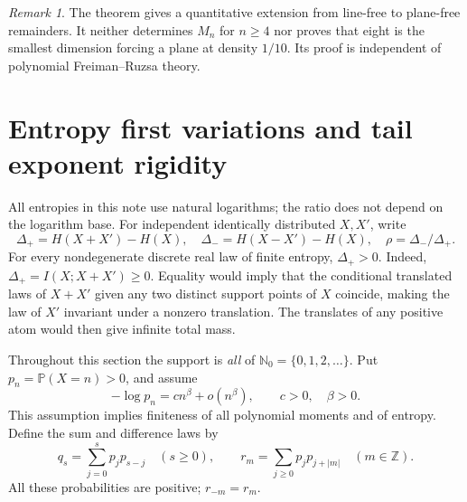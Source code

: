 \documentclass[11pt]{article}
\theoremstyle{remark}\newtheorem{remark}[theorem]{Remark}
\newcommand{\N}{\mathbb N_0}
\newcommand{\Prob}{\mathbb P}
\newcommand{\Dplus}{\Delta_+}
\newcommand{\Dminus}{\Delta_-}
\begin{document}
\begin{remark}
The theorem gives a quantitative extension from line-free to plane-free
remainders. It neither determines $M_n$ for $n\geq4$ nor proves that eight
is the smallest dimension forcing a plane at density $1/10$. Its proof is
independent of polynomial Freiman--Ruzsa theory.
\end{remark}

\section{Entropy first variations and tail exponent rigidity}

All entropies in this note use natural logarithms; the ratio does not depend
on the logarithm base. For independent identically distributed $X,X'$,
write
\[
 \Dplus=H(X+X')-H(X),\quad \Dminus=H(X-X')-H(X),\quad
 \rho=\Dminus/\Dplus.
\]
For every nondegenerate discrete real law of finite entropy,
$\Dplus>0$. Indeed, $\Dplus=I(X;X+X')\geq0$. Equality would imply that the
conditional translated laws of $X+X'$ given any two distinct support points
of $X$ coincide, making the law of $X'$ invariant under a nonzero
translation. The translates of any positive atom would then give infinite
total mass.

Throughout this section the support is \emph{all} of $\N=\{0,1,2,\ldots\}$.
Put $p_n=\Prob(X=n)>0$, and assume
\begin{equation}\label{eq:tail}
 -\log p_n=c n^\beta+o(n^\beta),\qquad c>0,\quad\beta>0.
\end{equation}
This assumption implies finiteness of all polynomial moments and of entropy.
Define the sum and difference laws by
\[
 q_s=\sum_{j=0}^s p_jp_{s-j}\quad(s\geq0),\qquad
 r_m=\sum_{j\geq0}p_jp_{j+|m|}\quad(m\in\mathbb Z).
\]
All these probabilities are positive; $r_{-m}=r_m$.
\end{document}
